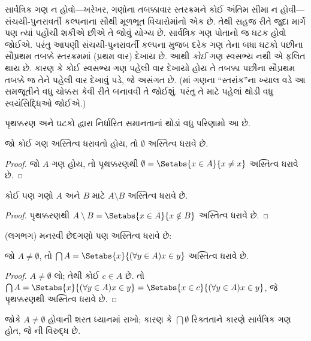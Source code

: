સાર્વત્રિક ગણ ન હોવો---ખરેખર, ગણોના તબક્કાવાર સ્તરક્રમને કોઈ
અંતિમ સીમા ન હોવી---સંચયી-પુનરાવર્તી કલ્પનાના સૌથી મૂળભૂત
વિચારોમાંનો એક છે. તેથી સહજ રીતે જુદા માર્ગે પણ ત્યાં પહોંચી
શકીએ છીએ તે જોવું યોગ્ય છે. સાર્વત્રિક ગણ પોતાનો જ
ઘટક હોવો જોઈએ. પરંતુ આપણી સંચયી-પુનરાવર્તી કલ્પના મુજબ
દરેક ગણ તેના બધા ઘટકો પછીના સૌપ્રથમ તબક્કે સ્તરક્રમમાં
(પ્રથમ વાર) દેખાય છે. આથી \emph{કોઈ} ગણ સ્વસભ્ય નથી એ ફલિત થાય
છે. કારણ કે કોઈ સ્વસભ્ય ગણ પહેલી વાર દેખાયો હોય તે તબક્કા
પછીના સૌપ્રથમ તબક્કે જ તેને પહેલી વાર દેખાવું પડે, જે અસંગત છે.
(માં ગણના ``સ્તરાંક''ના
ખ્યાલ વડે આ સમજૂતીને વધુ ચોક્કસ કેવી રીતે બનાવવી તે જોઈશું.
પરંતુ તે માટે પહેલાં થોડી વધુ સ્વયંસિદ્ધિઓ જોઈએ.)

પૃથક્કરણ અને ઘટકો દ્વારા નિર્ધારિત સમાનતાનાં થોડાં વધુ પરિણામો
આ છે.

\begin{prop}
જો કોઈ ગણ અસ્તિત્વ ધરાવતો હોય, તો $\emptyset$ અસ્તિત્વ ધરાવે છે.
\end{prop}

\begin{proof}
જો $A$ ગણ હોય, તો પૃથક્કરણથી
$\emptyset = \Setabs{x \in A}{x \neq x}$ અસ્તિત્વ ધરાવે છે.
\end{proof}

\begin{prop}
કોઈ પણ ગણો $A$ અને $B$ માટે $A \setminus B$ અસ્તિત્વ ધરાવે છે.
\end{prop}

\begin{proof}
પૃથક્કરણથી $A \setminus B = \Setabs{x \in A}{x \notin B}$
અસ્તિત્વ ધરાવે છે.
\end{proof}

(લગભગ) મનસ્વી છેદગણો પણ અસ્તિત્વ ધરાવે છે:

\begin{prop}
જો $A \neq \emptyset$, તો
$\bigcap A = \Setabs{x}{(\forall y \in A)x \in y}$ અસ્તિત્વ ધરાવે છે.
\end{prop}

\begin{proof}
$A \neq \emptyset$ લો; તેથી કોઈ $c \in A$ છે. તો
$\bigcap A =
\Setabs{x}{(\forall y \in A)x \in y} = \Setabs{x \in c}{(\forall y \in
A)x \in y}$, જે પૃથક્કરણથી અસ્તિત્વ ધરાવે છે.
\end{proof}

જોકે $A \neq \emptyset$ હોવાની શરત ધ્યાનમાં રાખો; કારણ કે
$\bigcap
\emptyset$ રિક્તતાને કારણે સાર્વત્રિક ગણ હોત, જે
ની વિરુદ્ધ છે.
\endgroup

